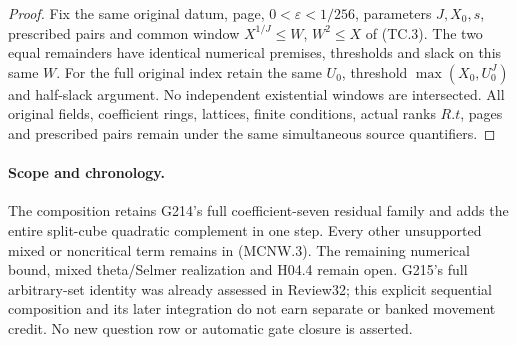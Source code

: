\begin{proof}
Fix the same original datum, page, $0<\varepsilon<1/256$,
parameters $J,X_0,s$, prescribed pairs and common window
$X^{1/J}\leq W$, $W^2\leq X$ of (TC.3).
The two equal remainders have identical numerical premises,
thresholds and slack on this same $W$.
For the full original index retain the same $U_0$,
threshold $\max(X_0,U_0^J)$ and half-slack argument.
No independent existential windows are intersected.
All original fields, coefficient rings, lattices, finite conditions,
actual ranks $R.t$, pages and prescribed pairs remain under
the same simultaneous source quantifiers.
\end{proof}

\paragraph{Scope and chronology.}
The composition retains G214's full coefficient-seven residual family
and adds the entire split-cube quadratic complement in one step.
Every other unsupported mixed or noncritical term remains in (MCNW.3).
The remaining numerical bound, mixed theta/Selmer realization and
H04.4 remain open. G215's full arbitrary-set identity was already
assessed in Review32; this explicit sequential composition and its
later integration do not earn separate or banked movement credit.
No new question row or automatic gate closure is asserted.
